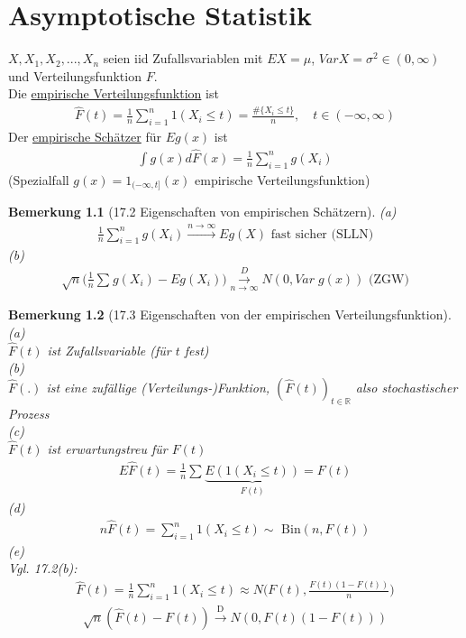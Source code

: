 \documentclass[a4paper,openany]{book}
\theoremstyle{mytheoremstyle}
\newtheorem*{bem}{Bemerkung}
\theoremstyle{mytheoremstyle2}
\begin{document}
\chapter{Asymptotische Statistik}
\begin{defi}{17.1}{}
  $X,X_1,X_2,...,X_n  $ seien iid Zufallsvariablen mit $EX=\mu  $, $VarX=\sigma ^2 \in (0,\infty ) $ und Verteilungsfunktion $F $.\\
  Die \underline{empirische Verteilungsfunktion} ist 
  \begin{align*}
    \hat{F}(t)=\frac{1}{n}\sum_{i=1}^{n}{1(X_i \leq t)}=\frac{\#\{X_i \leq t\}}{n},\quad t \in (-\infty ,\infty )
  \end{align*}
  Der \underline{empirische Schätzer} für $Eg(x) $ ist 
  \begin{align*}
    \int{g(x)d \hat{F}(x)}=\frac{1}{n}\sum_{i=1}^{n}{g(X_i)}
  \end{align*}
  (Spezialfall $g(x)=1 _{(-\infty ,t]}(x) $ empirische Verteilungsfunktion)
\end{defi}
\begin{bem}[17.2 Eigenschaften von empirischen Schätzern]
  (a)
  \begin{align*}
    \frac{1}{n}\sum_{i=1}^{n}{g(X_i)}\overset{n\to \infty }\longrightarrow Eg(X)\text{ fast sicher (SLLN)}
  \end{align*}
  (b)
  \begin{align*}
    \sqrt{n}\bigg(\frac{1}{n}\sum_{}^{}{g(X_i)-Eg(X_i)}\bigg)\overset{D}{\underset{n\to \infty }{\longrightarrow }}N(0,Var \;g(x)) \text{ (ZGW)}
  \end{align*}
\end{bem}
\begin{bem}[17.3 Eigenschaften von der empirischen Verteilungsfunktion]
  (a) \\
  $\hat{F}(t) $ ist Zufallsvariable (für $t  $ fest) \\
  (b)\\
  $\hat{F}(.) $ ist eine zufällige (Verteilungs-)Funktion, $(\hat{F}(t))_{t \in \mathbb{R}} $ also stochastischer Prozess
  \\
  (c)\\
  $\hat{F}(t) $ ist erwartungstreu für $F(t) $
  \begin{align*}
    E \hat{F}(t)=\frac{1}{n}\sum_{}^{}{\underbrace{E(1(X_i \leq t))}_{F(t)}}=F(t)
  \end{align*}
  (d)
  \begin{align*}
    n \hat{F}(t)=\sum_{i=1}^{n}{1(X_i \leq t)} \sim \text{ Bin}(n,F(t))
  \end{align*}
  (e)\\
  Vgl. 17.2(b): 
  \begin{align*}
    \hat{F}(t)=\frac{1}{n}\sum_{i=1}^{n}{1(X_i \leq t)} \approx N\bigg(F(t),\frac{F(t)(1-F(t))}{n}\bigg)
  \end{align*}
  \begin{align*}
    \sqrt{n}(\hat{F}(t)-F(t))\overset{\text{D}}\to N(0,F(t)(1-F(t)))
  \end{align*}
\end{bem}
\end{document}
